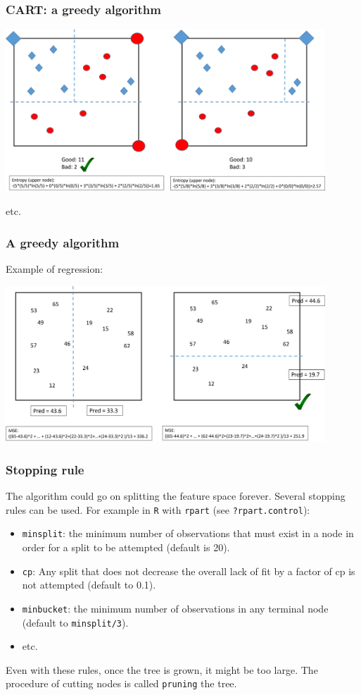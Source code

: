 \begin{frame}
\frametitle{CART: a greedy algorithm}
\begin{center}
\includegraphics[width=12cm]{../../Graphs/Cart_Build2.png}
\end{center}
etc.
\end{frame}
\begin{frame}
\frametitle{A greedy algorithm}
Example of regression:
\begin{center}
\includegraphics[width=12cm]{../../Graphs/RT_Build.png}
\end{center}
\end{frame}
\begin{frame}
\frametitle{Stopping rule}
The algorithm could go on splitting the feature space forever. Several stopping rules can be used. For example in {\tt R} with {\tt rpart} (see {\tt ?rpart.control}):
\begin{itemize}
\item {\tt minsplit}: the minimum number of observations that must exist in a node in order for a split to be attempted (default is 20).
\item {\tt cp}: Any split that does not decrease the overall lack of fit by a factor of cp is not attempted (default to 0.1).
\item {\tt minbucket}: the minimum number of observations in any terminal node (default to {\tt minsplit/3}).  
\item etc.
\end{itemize}
Even with these rules, once the tree is grown, it might be too large. The procedure of cutting nodes is called {\tt pruning} the tree.  
\end{frame}
